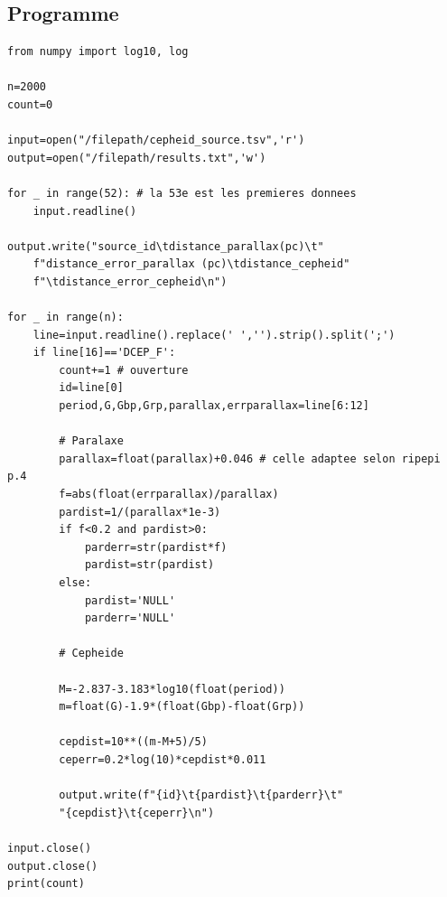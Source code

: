 \documentclass[12pt,a4paper,french]{scrartcl}
\begin{document}
\subsection{Programme}
\begin{lstlisting}
from numpy import log10, log

n=2000
count=0

input=open("/filepath/cepheid_source.tsv",'r')
output=open("/filepath/results.txt",'w')

for _ in range(52): # la 53e est les premieres donnees
    input.readline()

output.write("source_id\tdistance_parallax(pc)\t"
    f"distance_error_parallax (pc)\tdistance_cepheid"
    f"\tdistance_error_cepheid\n")

for _ in range(n):
    line=input.readline().replace(' ','').strip().split(';')
    if line[16]=='DCEP_F':
        count+=1 # ouverture
        id=line[0]
        period,G,Gbp,Grp,parallax,errparallax=line[6:12]

        # Paralaxe
        parallax=float(parallax)+0.046 # celle adaptee selon ripepi p.4
        f=abs(float(errparallax)/parallax)
        pardist=1/(parallax*1e-3) 
        if f<0.2 and pardist>0:
            parderr=str(pardist*f)
            pardist=str(pardist)
        else:
            pardist='NULL'
            parderr='NULL'

        # Cepheide

        M=-2.837-3.183*log10(float(period))
        m=float(G)-1.9*(float(Gbp)-float(Grp))

        cepdist=10**((m-M+5)/5)
        ceperr=0.2*log(10)*cepdist*0.011
        
        output.write(f"{id}\t{pardist}\t{parderr}\t"
        "{cepdist}\t{ceperr}\n")

input.close()
output.close()
print(count)
\end{lstlisting}
\end{document}
